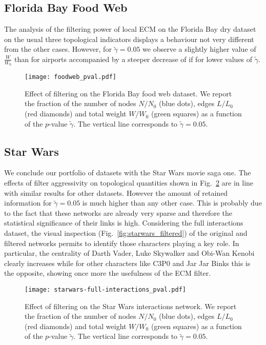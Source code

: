 \documentclass[aps,twocolumn,superscriptaddress]{revtex4-1}
\begin{document}
\subsection{Florida Bay Food Web}

The analysis of the filtering power of local ECM on the Florida Bay dry dataset on the usual three topological indicators displays a behaviour not very different from the other cases. However, for $\widetilde{\gamma} = 0.05$ we observe a slightly higher value of $\tfrac{W}{W_0}$ than for airports accompanied by a steeper decrease of if for lower values of $\widetilde{\gamma}$.


%
%
%
\begin{figure}[h!]
\centering
%
\texttt{[image: foodweb\_pval.pdf]}
%
\caption{Effect of filtering on the Florida Bay food web dataset. We report the fraction of the number of nodes $N/N_0$ (blue dots), edges $L/L_0$ (red diamonds) and total weight $W/W_0$ (green squares) as a function of the $p$-value $\widetilde{\gamma}$. The vertical line corresponds to $\widetilde{\gamma} = 0.05$.}
\label{fig:foodweb_filter_pval}
\end{figure}
%



\subsection{Star Wars}


We conclude our portfolio of datasets with the Star Wars movie saga one. The effects of filter aggressivity on topological quantities shown in Fig.~\ref{fig:starwars_filter_pval} are in line with similar results for other datasets. However the amount of retained information for $\widetilde{\gamma} = 0.05$ is much higher than any other case. This is probably due to the fact that these networks are already very sparse and therefore the statistical significance of their links is high. Considering the full interactions dataset, the visual inspection (Fig.~\ref{fig:starwars_filtered}) of the original and filtered networks permits to identify those characters playing a key role. In particular, the centrality of Darth Vader, Luke Skywalker and Obi-Wan Kenobi clearly increases while for other characters like C3P0 and Jar Jar Binks this is the opposite, showing once more the usefulness of the ECM filter.

%
%
%
\begin{figure}[h!]
\centering
%
\texttt{[image: starwars-full-interactions\_pval.pdf]}
%
\caption{Effect of filtering on the Star Wars interactions network. We report the fraction of the number of nodes $N/N_0$ (blue dots), edges $L/L_0$ (red diamonds) and total weight $W/W_0$ (green squares) as a function of the $p$-value $\widetilde{\gamma}$. The vertical line corresponds to $\widetilde{\gamma} = 0.05$.}
\label{fig:starwars_filter_pval}
\end{figure}
%
\end{document}
